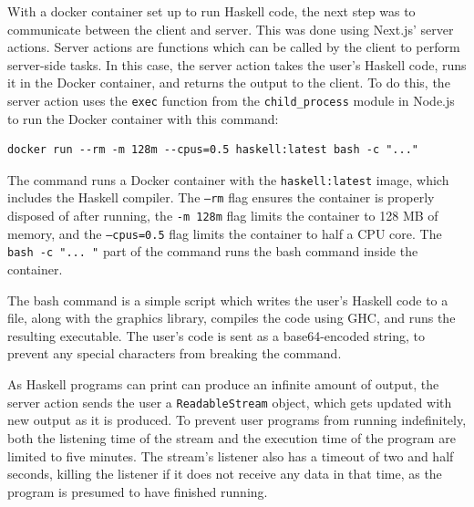 \documentclass[../main.tex]{subfiles}
\begin{document}
                    With a docker container set up to run Haskell code, the next step was to
                        communicate between the client and server.
                    This was done using Next.js' server actions.
                    Server actions are functions which can be called by the client to perform
                        server-side tasks.
                    In this case, the server action takes the user's Haskell code, runs it in the
                        Docker container, and returns the output to the client.
                    To do this, the server action uses the \texttt{exec} function from the
                        \texttt{child\_process} module in Node.js to run the Docker container with this
                        command: \begin{verbatim}
docker run --rm -m 128m --cpus=0.5 haskell:latest bash -c "..."\end{verbatim}

                        The command runs a Docker
                        container with the \texttt{haskell:latest} image, which includes the Haskell
                        compiler.
                    The \texttt{--rm} flag ensures the container is properly disposed of after
                        running, the \texttt{-m 128m} flag limits the container to 128 MB of memory,
                        and the \texttt{--cpus=0.5} flag limits the container to half a CPU core.
                    The \texttt{bash -c "...
                    "} part of the command runs the bash command
                    inside the container.

                    The bash command is a simple script which writes the user's Haskell code to a
                        file, along with the graphics library, compiles the code using GHC, and runs
                        the resulting executable.
                    The user's code is sent as a base64-encoded string, to prevent any special
                        characters from breaking the command.

                    As Haskell programs can print can produce an infinite amount of output, the
                        server action sends the user a \texttt{ReadableStream} object, which gets
                        updated with new output as it is produced.
                    To prevent user programs from running indefinitely, both the listening time of
                        the stream and the execution time of the program are limited to five minutes.
                    The stream's listener also has a timeout of two and half seconds, killing the
                        listener if it does not receive any data in that time, as the program is
                        presumed to have finished running.
\end{document}
